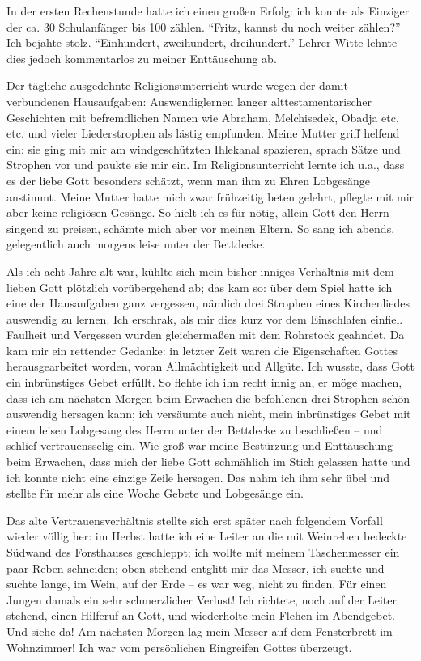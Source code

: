 \documentclass[a5paper,pagesize,10pt,twoside=true]{scrbook}
\begin{document}
In der ersten Rechenstunde hatte ich einen großen Erfolg: ich konnte als Einziger der ca. 30 Schulanfänger bis 100 zählen. \enquote{Fritz, kannst du noch weiter zählen?} Ich bejahte stolz. \enquote{Einhundert, zweihundert, dreihundert.} Lehrer Witte lehnte dies jedoch kommentarlos zu meiner Enttäuschung ab.

Der tägliche ausgedehnte Religionsunterricht wurde wegen der damit verbundenen Hausaufgaben: Auswendiglernen langer alttestamentarischer Geschichten mit befremdlichen Namen wie Abraham, Melchisedek, Obadja etc. etc. und vieler Liederstrophen als lästig empfunden. Meine Mutter griff helfend ein: sie ging mit mir am windgeschützten Ihlekanal spazieren, sprach Sätze und Strophen vor und paukte sie mir ein. Im Religionsunterricht lernte ich u.a., dass es der liebe Gott besonders schätzt, wenn man ihm zu Ehren Lobgesänge anstimmt. Meine Mutter hatte mich zwar frühzeitig beten gelehrt, pflegte mit mir aber keine religiösen Gesänge. So hielt ich es für nötig, allein Gott den Herrn singend zu preisen, schämte mich aber vor meinen Eltern. So sang ich abends, gelegentlich auch morgens leise unter der Bettdecke.

Als ich acht Jahre alt war, kühlte sich mein bisher inniges Verhältnis mit dem lieben Gott plötzlich vorübergehend ab; das kam so: über dem Spiel hatte ich eine der Hausaufgaben ganz vergessen, nämlich drei Strophen eines Kirchenliedes auswendig zu lernen. Ich erschrak, als mir dies kurz vor dem Einschlafen einfiel. Faulheit und Vergessen wurden gleichermaßen mit dem Rohrstock geahndet. Da kam mir ein rettender Gedanke: in letzter Zeit waren die Eigenschaften Gottes herausgearbeitet worden, voran Allmächtigkeit und Allgüte. Ich wusste, dass Gott ein inbrünstiges Gebet erfüllt. So flehte ich ihn recht innig an, er möge machen, dass ich am nächsten Morgen beim Erwachen die befohlenen drei Strophen schön auswendig hersagen kann; ich versäumte auch nicht, mein inbrünstiges Gebet mit einem leisen Lobgesang des Herrn unter der Bettdecke zu beschließen -- und schlief vertrauensselig ein. Wie groß war meine Bestürzung und Enttäuschung beim Erwachen, dass mich der liebe Gott schmählich im Stich gelassen hatte und ich konnte nicht eine einzige Zeile hersagen. Das nahm ich ihm sehr übel und stellte für mehr als eine Woche Gebete und Lobgesänge ein.

Das alte Vertrauensverhältnis stellte sich erst später nach folgendem Vorfall wieder völlig her: im Herbst hatte ich eine Leiter an die mit Weinreben bedeckte Südwand des Forsthauses geschleppt; ich wollte mit meinem Taschenmesser ein paar Reben schneiden; oben stehend entglitt mir das Messer, ich suchte und suchte lange, im Wein, auf der Erde -- es war weg, nicht zu finden. Für einen Jungen damals ein sehr schmerzlicher Verlust! Ich richtete, noch auf der Leiter stehend, einen Hilferuf an Gott, und wiederholte mein Flehen im Abendgebet. Und siehe da! Am nächsten Morgen lag mein Messer auf dem Fensterbrett im Wohnzimmer! Ich war vom persönlichen Eingreifen Gottes überzeugt.
\end{document}
